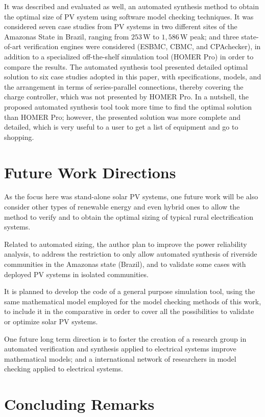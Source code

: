 It was described and evaluated as well, an automated synthesis method to obtain the optimal size of PV system using software model checking techniques. It was considered seven case studies from PV systems in two different sites of the Amazonas State in Brazil, ranging from $253$\,W to $1,586$\,W peak; and three state-of-art verification engines were considered (ESBMC, CBMC, and CPAchecker), in addition to a specialized off-the-shelf simulation tool (HOMER Pro) in order to compare the results. The automated synthesis tool presented detailed optimal solution to six case studies adopted in this paper, with specifications, models, and the arrangement in terms of series-parallel connections, thereby covering the charge controller, which was not presented by HOMER Pro. In a nutshell, the proposed automated synthesis tool took more time to find the optimal solution than HOMER Pro; however, the presented solution was more complete and detailed, which is very useful to a user to get a list of equipment and go to shopping.


\section{Future Work Directions}

As the focus here was stand-alone solar PV systems, one future work will be also consider other types of renewable energy and even hybrid ones to allow the method to verify and to obtain the optimal sizing of typical rural electrification systems.

Related to automated sizing, the author plan to improve the power reliability analysis, 
to address the restriction to only allow automated synthesis of riverside communities in the Amazonas state (Brazil), and to validate some cases with deployed PV systems in isolated communities.

It is planned to develop the code of a general purpose simulation tool, using the same mathematical model employed for the model checking methods of this work, to include it in the comparative in order to cover all the possibilities to validate or optimize solar PV systems.

One future long term direction is to foster the creation of a research group in automated verification and synthesis applied to electrical systems improve mathematical models; and a international network of researchers in model checking applied to electrical systems.


\section{Concluding Remarks}


